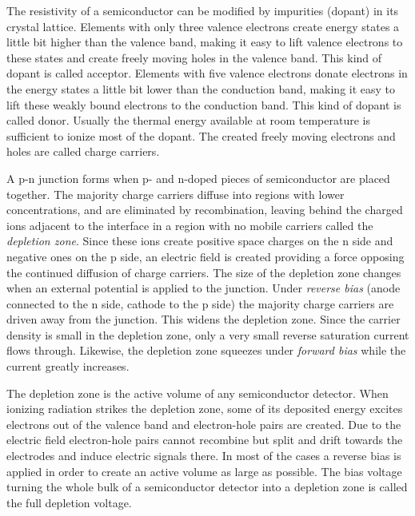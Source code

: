 The resistivity of a semiconductor can be modified by impurities (dopant) in its crystal lattice. Elements with only three valence electrons create energy states a little bit higher than the valence band, making it easy to lift valence electrons to these states and create freely moving holes in the valence band. This kind of dopant is called acceptor. Elements with five valence electrons donate electrons in the energy states a little bit lower than the conduction band, making it easy to lift these weakly bound electrons to the conduction band. This kind of dopant is called donor. Usually the thermal energy available at room temperature is sufficient to ionize most of the dopant. The created freely moving electrons and holes are called charge carriers.

A p-n junction forms when p- and n-doped pieces of semiconductor are placed together. The majority charge carriers diffuse into regions with lower concentrations, and are eliminated by recombination, leaving behind the charged ions adjacent to the interface in a region with no mobile carriers called the \emph{depletion zone}. Since these ions create positive space charges on the n side and negative ones on the p side, an electric field is created providing a force opposing the continued diffusion of charge carriers. The size of the depletion zone changes when an external potential is applied to the junction. Under \emph{reverse bias} (anode connected to the n side, cathode to the p side) the majority charge carriers are driven away from the junction. This widens the depletion zone. Since the carrier density is small in the depletion zone, only a very small reverse saturation current flows through. Likewise, the depletion zone squeezes under \emph{forward bias} while the current greatly increases.

The depletion zone is the active volume of any semiconductor detector. When ionizing radiation strikes the depletion zone, some of its deposited energy excites electrons out of the valence band and electron-hole pairs are created. Due to the electric field electron-hole pairs cannot recombine but split and drift towards the electrodes and induce electric signals there. In most of the cases a reverse bias is applied in order to create an active volume as large as possible. The bias voltage turning the whole bulk of a semiconductor detector into a depletion zone is called the full depletion voltage.

